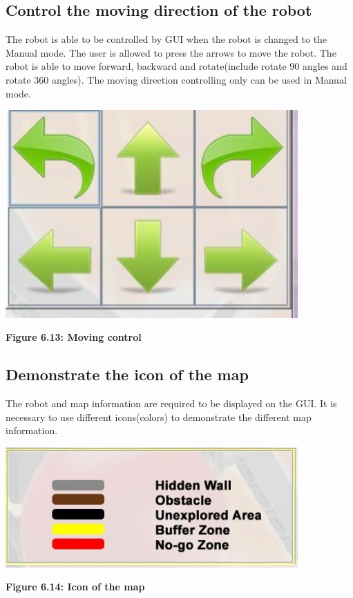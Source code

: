 \documentclass[11pt, a4paper]{report}
\begin{document}
\subsection{Control the moving direction of the robot}
The robot is able to be controlled by GUI when the robot is changed to the Manual mode. The user is allowed to press the arrows to move the robot. The robot is able to move forward, backward and rotate(include rotate 90 angles and rotate 360 angles). The moving direction controlling only can be used in Manual mode.
 \begin{center}
 \includegraphics[width=11.20cm]{ControlButton.jpg}
\end{center}
\begin{center}
\textbf {Figure 6.13: Moving control} \\[0.3cm]
\end{center}
\subsection{Demonstrate the icon of the map}
The robot and map information are required to be displayed on the GUI. It is necessary to use different icons(colors) to demonstrate the different map information.
  \begin{center}
 \includegraphics[width=11.20cm]{IconInformation.jpg}
\end{center}
\begin{center}
\textbf {Figure 6.14: Icon of the map} \\[0.3cm]
\end{center}
\end{document}
